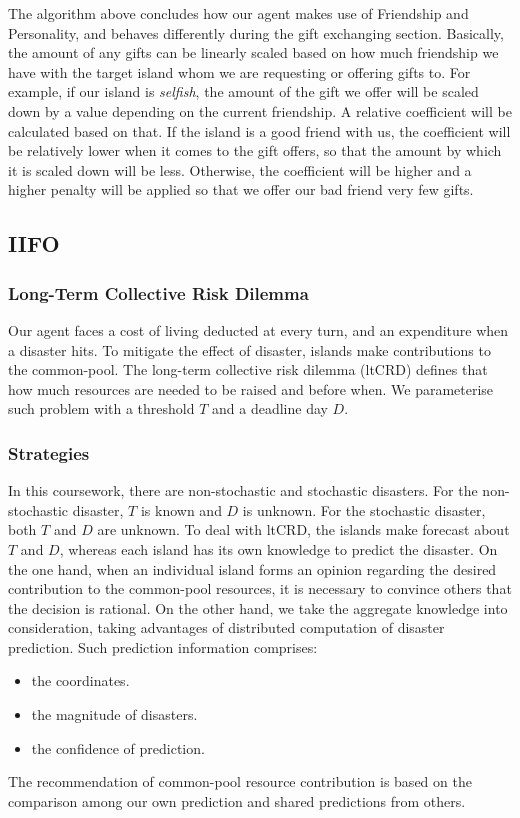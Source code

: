The algorithm above concludes how our agent makes use of Friendship and Personality, and behaves differently during the gift exchanging section. Basically, the amount of any gifts can be linearly scaled based on how much friendship we have with the target island whom we are requesting or offering gifts to. For example, if our island is \emph{selfish}, the amount of the gift we offer will be scaled down by a value depending on the current friendship. A relative coefficient will be calculated based on that. If the island is a good friend with us, the coefficient will be relatively lower when it comes to the gift offers, so that the amount by which it is scaled down will be less. Otherwise, the coefficient will be higher and a higher penalty will be applied so that we offer our bad friend very few gifts.

\subsection{IIFO} \label{subsec:Team6_IIFO}
\subsubsection{Long-Term Collective Risk Dilemma} \label{subsubsec:Team6_IIFO:ltCRD}
Our agent faces a cost of living deducted at every turn, and an expenditure when a disaster hits. To mitigate the effect of disaster, islands make contributions to the common-pool. The long-term collective risk dilemma (ltCRD) defines that how much resources are needed to be raised and before when. We parameterise such problem with a threshold $T$ and a deadline day $D$.


\subsubsection{Strategies} \label{subsubsec:Team6_IIFO:Strategies}
In this coursework, there are non-stochastic and stochastic disasters. For the non-stochastic disaster, $T$ is known and $D$ is unknown. For the stochastic disaster, both $T$ and $D$ are unknown. To deal with ltCRD, the islands make forecast about $T$ and $D$, whereas each island has its own knowledge to predict the disaster. On the one hand, when an individual island forms an opinion regarding the desired contribution to the common-pool resources, it is necessary to convince others that the decision is rational. On the other hand, we take the aggregate knowledge into consideration, taking advantages of distributed computation of disaster prediction. Such prediction information comprises:
\begin{itemize}
    \item the coordinates.
    \item the magnitude of disasters.
    \item the confidence of prediction.
\end{itemize}
The recommendation of common-pool resource contribution is based on the comparison among our own prediction and shared predictions from others. 

